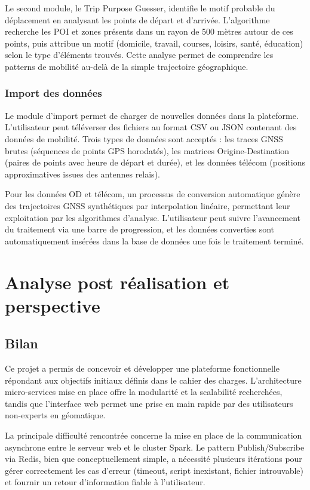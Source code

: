 \documentclass[french]{tai_info} %
\begin{document}
Le second module, le Trip Purpose Guesser, identifie le motif probable du déplacement en analysant les points de départ et d'arrivée. L'algorithme recherche les POI et zones présents dans un rayon de 500 mètres autour de ces points, puis attribue un motif (domicile, travail, courses, loisirs, santé, éducation) selon le type d'éléments trouvés. Cette analyse permet de comprendre les patterns de mobilité au-delà de la simple trajectoire géographique.

\subsubsection{Import des données}

Le module d'import permet de charger de nouvelles données dans la plateforme. L'utilisateur peut téléverser des fichiers au format CSV ou JSON contenant des données de mobilité. Trois types de données sont acceptés : les traces GNSS brutes (séquences de points GPS horodatés), les matrices Origine-Destination (paires de points avec heure de départ et durée), et les données télécom (positions approximatives issues des antennes relais).

Pour les données OD et télécom, un processus de conversion automatique génère des trajectoires GNSS synthétiques par interpolation linéaire, permettant leur exploitation par les algorithmes d'analyse. L'utilisateur peut suivre l'avancement du traitement via une barre de progression, et les données converties sont automatiquement insérées dans la base de données une fois le traitement terminé.

\section{Analyse post réalisation et perspective}

\subsection{Bilan}

Ce projet a permis de concevoir et développer une plateforme fonctionnelle répondant aux objectifs initiaux définis dans le cahier des charges. L'architecture micro-services mise en place offre la modularité et la scalabilité recherchées, tandis que l'interface web permet une prise en main rapide par des utilisateurs non-experts en géomatique.

La principale difficulté rencontrée concerne la mise en place de la communication asynchrone entre le serveur web et le cluster Spark. Le pattern Publish/Subscribe via Redis, bien que conceptuellement simple, a nécessité plusieurs itérations pour gérer correctement les cas d'erreur (timeout, script inexistant, fichier introuvable) et fournir un retour d'information fiable à l'utilisateur.
\end{document}
